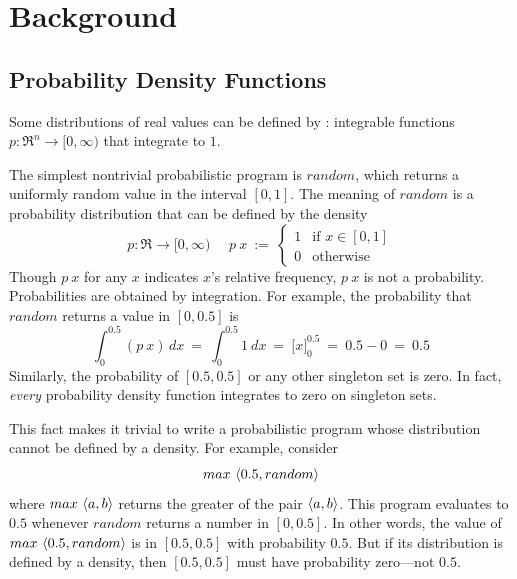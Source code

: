 \documentclass{llncs}
\begin{document}
\section{Background}
\label{sec:background}

\subsection{Probability Density Functions}

Some distributions of real values can be defined by : integrable functions $p : \Re^n \to [0,\infty)$ that integrate to $1$.

The simplest nontrivial probabilistic program is $random$, which returns a uniformly random value in the interval $[0,1]$.
The meaning of $random$ is a probability distribution that can be defined by the density
\begin{equation}
	p : \Re \to [0,\infty)\ \ \ \ \ \ p~x\ :=\
	\begin{cases}
		1 & \text{if } x \in [0,1] \\
		0 & \text{otherwise}
	\end{cases}
\label{eqn:uniform-density}
\end{equation}
Though $p~x$ for any $x$ indicates $x$'s relative frequency, $p~x$ is not a probability.
Probabilities are obtained by integration.
For example, the probability that $random$ returns a value in $[0,0.5]$ is
\begin{equation}
	\int_{0}^{0.5} (p~x)\, \mathit{d}x\ = \
	\int_{0}^{0.5} 1\ \mathit{d}x\ = \
	\Big[x \Big]_{0}^{0.5}\ = \
	0.5 - 0\ = \
	0.5
\end{equation}
Similarly, the probability of $[0.5,0.5]$ or any other singleton set is zero.
In fact, \emph{every} probability density function integrates to zero on singleton sets.

This fact makes it trivial to write a probabilistic program whose distribution cannot be defined by a density.
For example, consider
\begin{equation}
	max~\langle{0.5,random}\rangle
\end{equation}
where $max~\langle{a,b}\rangle$ returns the greater of the pair $\langle{a,b}\rangle$.
This program evaluates to $0.5$ whenever $random$ returns a number in $[0,0.5]$.
In other words, the value of $max~\langle{0.5,random}\rangle$ is in $[0.5,0.5]$ with probability $0.5$.
But if its distribution is defined by a density, then $[0.5,0.5]$ must have probability zero---not $0.5$.
\end{document}
